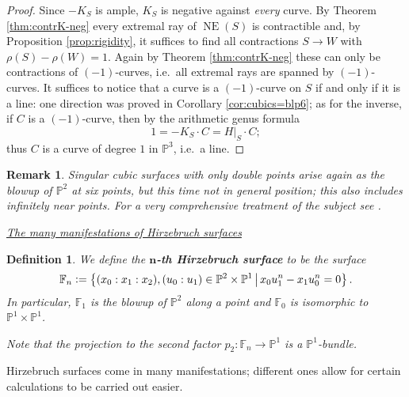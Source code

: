 \documentclass[a4paper,11pt]{amsart}
\newtheorem{remark}[theorem]{Remark}
\newtheorem{definition}[theorem]{Definition}
\def\NE{\operatorname{NE}}
\newcommand{\PP}{\mathbb{P}}
\renewcommand{\FF}{\mathbb{F}}
\newcommand{\defeq}{\vcentcolon=}
\begin{document}
\begin{proof}
	Since $-K_S$ is ample, $K_S$ is negative against \emph{every} curve.
	By Theorem \ref{thm:contrK-neg} every extremal ray of $\NE(S)$ is contractible and, by Proposition \ref{prop:rigidity}, it suffices to find all contractions $S \to W$ with $\rho(S) - \rho(W) =1$.
	Again by Theorem \ref{thm:contrK-neg} these can only be contractions of $(-1)$-curves, i.e.\ all extremal rays are spanned by $(-1)$-curves.
	It suffices to notice that a curve is a $(-1)$-curve on $S$  if and only if it is a line:
	one direction was proved in Corollary \ref{cor:cubics=blp6};
	as for the inverse, if $C$ is a $(-1)$-curve, then by the arithmetic genus formula 
	\[
	1 = -K_S\cdot C = H|_S\cdot C;
	\]
	thus $C$ is a curve of degree $1$ in $\PP^3$, i.e.\ a line.
\end{proof}

\begin{remark}
	Singular cubic surfaces with only double points arise again as the blowup of $\PP^2$ at six points, but this time not in general position; this also includes infinitely near points.
	For a very comprehensive treatment of the subject see \cite[Chapter 9]{Dolgachev}.
\end{remark}


\noindent\underline{\emph{The many manifestations of Hirzebruch surfaces}}

\begin{definition}
	We define the \textbf{$\mathbf{n}$-th Hirzebruch surface} to be the surface
	\[
	\FF_n \defeq \left\{ (x_0:x_1:x_2),(u_0:u_1) \in \PP^2\times \PP^1 \, \middle| \, x_0u_1^n - x_1u_0^n = 0 \right\}.
	\]
	In particular, $\FF_1$ is the blowup of $\PP^2$ along a point and $\FF_0$ is isomorphic to $\PP^1 \times \PP^1$.
	
	Note that the projection to the second factor $p_2 \colon \FF_n \to \PP^1$ is a $\PP^1$-bundle.
\end{definition}

Hirzebruch surfaces come in many manifestations;
different ones allow for certain calculations to be carried out easier.

\vspace{.3cm}
\end{document}
